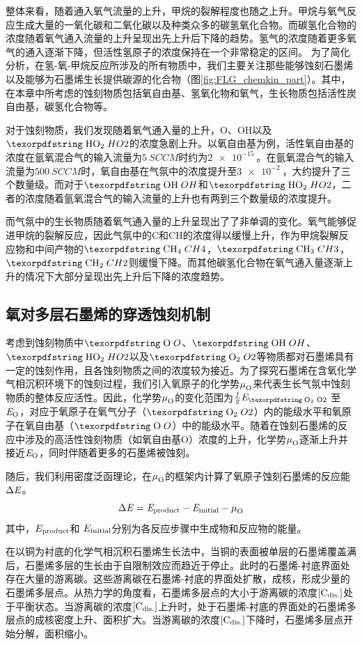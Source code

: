 整体来看，随着通入氧气流量的上升，甲烷的裂解程度也随之上升。甲烷与氧气反应生成大量的一氧化碳和二氧化碳以及种类众多的碳氢氧化合物。而碳氢化合物的浓度随着氧气通入流量的上升呈现出先上升后下降的趋势。氢气的浓度随着更多氧气的通入逐渐下降，但活性氢原子的浓度保持在一个非常稳定的区间。
为了简化分析，在氢-氧-甲烷反应所涉及的所有物质中，我们主要关注那些能够蚀刻石墨烯以及能够为石墨烯生长提供碳源的化合物（图\ref{fig:FLG_chemkin_part}）。其中，在本章中所考虑的蚀刻物质包括氧自由基、氢氧化物和氧气，生长物质包括活性炭自由基，碳氢化合物等。

对于蚀刻物质，我们发现随着氧气通入量的上升，O、OH以及$\cemb{HO2}$的浓度急剧上升。以氧自由基为例，活性氧自由基的浓度在氩氧混合气的输入流量为$\SI{5}{SCCM}$时约为$\SI{2e-15}{}$。在氩氧混合气的输入流量为$\SI{500}{SCCM}$时，氧自由基在气氛中的浓度提升至$\SI{3e-2}{}$，大约提升了三个数量级。而对于$\cemb{OH}$和$\cemb{HO2}$，二者的浓度随着氩氧混合气的输入流量的上升也有两到三个数量级的浓度提升。

而气氛中的生长物质随着氧气通入量的上升呈现出了了非单调的变化。氧气能够促进甲烷的裂解反应，因此气氛中的C和CH的浓度得以缓慢上升，作为甲烷裂解反应物和中间产物的$\cemb{CH4}$，$\cemb{CH3}$，$\cemb{CH2}$则缓慢下降。而其他碳氢化合物在氧气通入量逐渐上升的情况下大部分呈现出先上升后下降的浓度趋势。
\subsection{氧对多层石墨烯的穿透蚀刻机制}
\label{subsec:FLG_Oetch}

考虑到蚀刻物质中$\cemb{O}$、$\cemb{OH}$、$\cemb{HO2}$以及$\cemb{O2}$等物质都对石墨烯具有一定的蚀刻作用，且各蚀刻物质之间的浓度较为接近。为了探究石墨烯在含氧化学气相沉积环境下的蚀刻过程，我们引入氧原子的化学势$\it \mu_{\rm O}^{\rm } \it$来代表生长气氛中蚀刻物质的整体反应活性。因此，化学势$\it \mu_{\rm O}^{\rm } \it$的变化范围为$\halfEOm$ 至 $\it E_{\rm O} \it$，对应于氧原子在氧气分子（$\cemb{O2}$）内的能级水平和氧原子在氧自由基（$\cemb{O}$）中的能级水平。随着在蚀刻石墨烯的反应中涉及的高活性蚀刻物质（如氧自由基O）浓度的上升，化学势$\it \mu_{\rm O}^{\rm } \it$逐渐上升并接近$\it E_{\rm O} \it$，同时伴随着更多的石墨烯被蚀刻。

随后，我们利用密度泛函理论，在$\it \mu_{\rm O}^{\rm } \it$的框架内计算了氧原子蚀刻石墨烯的反应能$\rm{\Delta} \it E$。
\begin{equation}
    \rm{\Delta} \it E = E_{\rm product} - E_{\rm initial} - \it \mu_{\rm O}^{\rm } \it
\end{equation}
其中，$E_{\rm product}$和 $E_{\rm initial}$分别为各反应步骤中生成物和反应物的能量。

在以铜为衬底的化学气相沉积石墨烯生长法中，当铜的表面被单层的石墨烯覆盖满后，石墨烯多层的生长由于自限制效应而趋近于停止。此时的石墨烯-衬底界面处存在大量的游离碳。这些游离碳在石墨烯-衬底的界面处扩散，成核，形成少量的石墨烯多层点。从热力学的角度看，石墨烯多层点的大小于游离碳的浓度$\rm{\left[C_{dis.}\right]} \it$处于平衡状态。当游离碳的浓度$\rm{\left[C_{dis.}\right]} \it$上升时，处于石墨烯-衬底的界面处的石墨烯多层点的成核密度上升、面积扩大。当游离碳的浓度$\rm{\left[C_{dis.}\right]} \it$下降时，石墨烯多层点开始分解，面积缩小。

